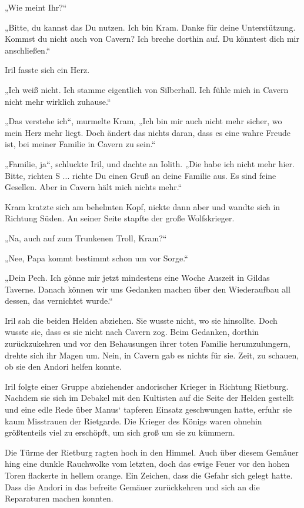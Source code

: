 „Wie meint Ihr?“

„Bitte, du kannst das Du nutzen. Ich bin Kram. Danke für deine Unterstützung. Kommst du nicht auch von Cavern? Ich breche dorthin auf. Du könntest dich mir anschließen.“

Iril fasste sich ein Herz.

„Ich weiß nicht. Ich stamme eigentlich von Silberhall. Ich fühle mich in Cavern nicht mehr wirklich zuhause.“

„Das verstehe ich“, murmelte Kram, „Ich bin mir auch nicht mehr sicher, wo mein Herz mehr liegt. Doch ändert das nichts daran, dass es eine wahre Freude ist, bei meiner Familie in Cavern zu sein.“

„Familie, ja“, schluckte Iril, und dachte an Iolith. „Die habe ich nicht mehr hier. Bitte, richten S ... richte Du einen Gruß an deine Familie aus. Es sind feine Gesellen. Aber in Cavern hält mich nichts mehr.“

Kram kratzte sich am behelmten Kopf, nickte dann aber und wandte sich in Richtung Süden. An seiner Seite stapfte der große Wolfskrieger.

„Na, auch auf zum Trunkenen Troll, Kram?“

„Nee, Papa kommt bestimmt schon um vor Sorge.“

„Dein Pech. Ich gönne mir jetzt mindestens eine Woche Auszeit in Gildas Taverne. Danach können wir uns Gedanken machen über den Wiederaufbau all dessen, das vernichtet wurde.“

Iril sah die beiden Helden abziehen. Sie wusste nicht, wo sie hinsollte. Doch wusste sie, dass es sie nicht nach Cavern zog. Beim Gedanken, dorthin zurückzukehren und vor den Behausungen ihrer toten Familie herumzulungern, drehte sich ihr Magen um. Nein, in Cavern gab es nichts für sie. Zeit, zu schauen, ob sie den Andori helfen konnte.\bigskip







Iril folgte einer Gruppe abziehender andorischer Krieger in Richtung Rietburg. Nachdem sie sich im Debakel mit den Kultisten auf die Seite der Helden gestellt und eine edle Rede über Manus‘ tapferen Einsatz geschwungen hatte, erfuhr sie kaum Misstrauen der Rietgarde. Die Krieger des Königs waren ohnehin größtenteils viel zu erschöpft, um sich groß um sie zu kümmern.

Die Türme der Rietburg ragten hoch in den Himmel. Auch über diesem Gemäuer hing eine dunkle Rauchwolke vom letzten, doch das ewige Feuer vor den hohen Toren flackerte in hellem orange. Ein Zeichen, dass die Gefahr sich gelegt hatte. Dass die Andori in das befreite Gemäuer zurückkehren und sich an die Reparaturen machen konnten.

